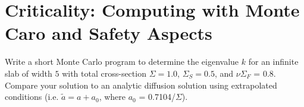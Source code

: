 \chapter[Criticality]{Criticality: Computing with Monte Caro and Safety Aspects}
\label{lec:criticality}

\begin{exercises}

  \item Write a short Monte Carlo program to determine the eigenvalue $k$ for an infinite slab of width $5$ with total cross-section $\Sigma = 1.0$, $\Sigma_S = 0.5$, and $\nu\Sigma_F$ = 0.8.  Compare your solution to an analytic diffusion solution using extrapolated conditions (i.e. $\tilde{a} = a+a_0$, where $a_0$ = 0.7104/$\Sigma$).
\end{exercises}